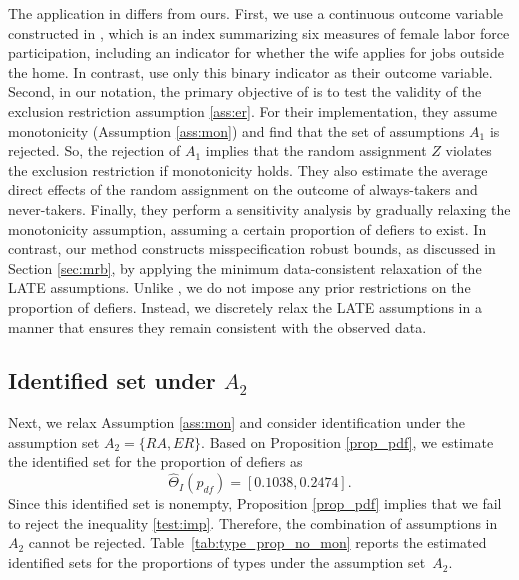 \documentclass[12pt]{article}
\theoremstyle{plain}
\theoremstyle{definition}
\theoremstyle{remark}
\begin{document}
The application in \cite{kwon2024testing} differs from ours. 
First, we use a continuous outcome variable constructed in \cite{bursztyn2020misperceived}, which is an index summarizing six measures of female labor force participation, including an indicator for whether the wife applies for jobs outside the home. In contrast, \cite{kwon2024testing} use only this binary indicator as their outcome variable.
Second, in our  notation, the primary objective of \cite{kwon2024testing} is to test the validity of the exclusion restriction  assumption \ref{ass:er}. For their implementation, they assume monotonicity (Assumption \ref{ass:mon}) and find that the set of assumptions $A_1$ is rejected. So, the rejection of $A_1$ implies that the random assignment $Z$ violates the exclusion restriction if monotonicity holds. They also estimate the average direct effects of the random assignment on the outcome of always-takers and never-takers. Finally, they perform a sensitivity analysis by gradually relaxing the monotonicity assumption, assuming a certain proportion of defiers to exist.
In contrast, our method constructs misspecification robust bounds, as discussed in Section \ref{sec:mrb}, by applying the minimum data-consistent relaxation of the LATE assumptions. Unlike \cite{kwon2024testing}, we do not impose any prior restrictions on the proportion of defiers. Instead, we discretely relax the LATE assumptions in a manner that ensures they remain consistent with the observed data.

\subsection{Identified set under $A_2$}

Next, we relax Assumption \ref{ass:mon} and consider identification under the assumption set $A_2 = \{RA, ER\}$. Based on Proposition \ref{prop_pdf}, we estimate the identified set for the proportion of defiers as
\begin{equation*}
    \widehat{\Theta}_I(p_{df}) = [0.1038, 0.2474].
\end{equation*}
Since this identified set is nonempty, Proposition \ref{prop_pdf} implies that we fail to reject the inequality \eqref{test:imp}. Therefore, the combination of assumptions in $A_2$ cannot be rejected. Table~\ref{tab:type_prop_no_mon} reports the estimated identified sets for the proportions of types under the assumption set~$A_2$.
\end{document}

